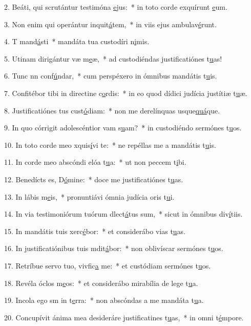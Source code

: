2. Beáti, qui scrutántur testimóna \uline{e}jus:~* in toto corde exquírunt \uline{e}um.\par 
3. Non enim qui operántur inquit\uline{á}tem,~* in viis ejus ambulav\uline{é}runt.\par 
4. T mand\uline{á}sti~* mandáta tua custodíri n\uline{i}mis.\par 
5. Utinam dirigántur væ m\uline{e}æ,~* ad custodiéndas justificatiónes t\uline{u}as!\par 
6. Tunc nn conf\uline{ú}ndar,~* cum perspéxero in ómnibus mandátis t\uline{u}is.\par 
7. Confitébor tibi in directine c\uline{o}rdis:~* in eo quod dídici judícia justítiæ t\uline{u}æ.\par 
8. Justificatiónes tus cust\uline{ó}diam:~* non me derelínquas usque\uline{quá}que.\par 
9. In quo córrigit adolescéntior vam s\uline{u}am?~* in custodiéndo sermónes t\uline{u}os.\par 
10. In toto corde meo xquis\uline{í}vi te:~* ne repéllas me a mandátis t\uline{u}is.\par 
11. In corde meo abscóndi elóa t\uline{u}a:~* ut non peccem t\uline{i}bi.\par 
12. Benedícts es, D\uline{ó}mine:~* doce me justificatiónes t\uline{u}as.\par 
13. In lábis m\uline{e}is,~* pronuntiávi ómnia judícia oris t\uline{u}i.\par 
14. In via testimoniórum tuórum dlect\uline{á}tus sum,~* sicut in ómnibus div\uline{í}tiis.\par 
15. In mandátis tuis xerc\uline{é}bor:~* et considerábo vias t\uline{u}as.\par 
16. In justificatiónibus tuis mdit\uline{á}bor:~* non oblivíscar sermónes t\uline{u}os.\par 
17. Retríbue servo tuo, vivfic\uline{a} me:~* et custódiam sermónes t\uline{u}os.\par 
18. Revéla óclos m\uline{e}os:~* et considerábo mirabília de lege t\uline{u}a.\par 
19. Incola ego sm in t\uline{e}rra:~* non abscóndas a me mandáta t\uline{u}a.\par 
20. Concupívit ánima mea desideráre justificatines t\uline{u}as,~* in omni t\uline{é}mpore.\par 
